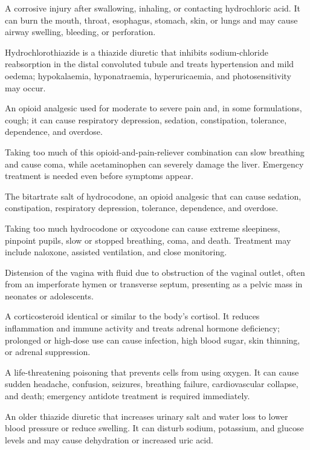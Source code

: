  A corrosive injury after swallowing, inhaling, or contacting hydrochloric acid. It can burn the mouth, throat, esophagus, stomach, skin, or lungs and may cause airway swelling, bleeding, or perforation.

 Hydrochlorothiazide is a thiazide diuretic that inhibits sodium-chloride reabsorption in the distal convoluted tubule and treats hypertension and mild oedema; hypokalaemia, hyponatraemia, hyperuricaemia, and photosensitivity may occur.

 An opioid analgesic used for moderate to severe pain and, in some formulations, cough; it can cause respiratory depression, sedation, constipation, tolerance, dependence, and overdose.

 Taking too much of this opioid-and-pain-reliever combination can slow breathing and cause coma, while acetaminophen can severely damage the liver. Emergency treatment is needed even before symptoms appear.

 The bitartrate salt of hydrocodone, an opioid analgesic that can cause sedation, constipation, respiratory depression, tolerance, dependence, and overdose.

 Taking too much hydrocodone or oxycodone can cause extreme sleepiness, pinpoint pupils, slow or stopped breathing, coma, and death. Treatment may include naloxone, assisted ventilation, and close monitoring.

 Distension of the vagina with fluid due to obstruction of the vaginal outlet, often from
an imperforate hymen or transverse septum, presenting as a pelvic mass in neonates or
adolescents.

 A corticosteroid identical or similar to the body’s cortisol. It reduces inflammation and immune activity and treats adrenal hormone deficiency; prolonged or high-dose use can cause infection, high blood sugar, skin thinning, or adrenal suppression.

 A life-threatening poisoning that prevents cells from using oxygen. It can cause sudden headache, confusion, seizures, breathing failure, cardiovascular collapse, and death; emergency antidote treatment is required immediately.

 An older thiazide diuretic that increases urinary salt and water loss to lower blood pressure or reduce swelling. It can disturb sodium, potassium, and glucose levels and may cause dehydration or increased uric acid.

